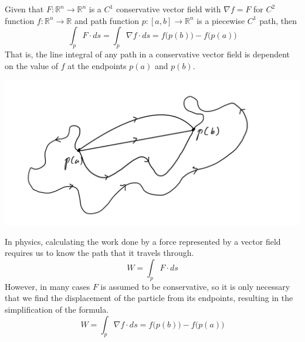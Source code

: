   \begin{theorem}
  Given that $F: \mathbb{R}^n \longrightarrow \mathbb{R}^n$ is a $C^1$ conservative vector field with $\nabla f = F$ for $C^2$ function $f: \mathbb{R}^n \longrightarrow \mathbb{R}$ and path function $p: [a,b] \longrightarrow \mathbb{R}^n$ is a piecewise $C^1$ path, then 
  \[\int_p F \cdot d s = \int_p \nabla f \cdot d s = f\big(p(b)\big) - f\big(p(a)\big)\]
  That is, the line integral of any path in a conservative vector field is dependent on the value of $f$ at the endpoints $p(a)$ and $p(b)$. 
  \begin{center}
      \includegraphics[scale=0.2]{img/Line_Integral_Independence_of_path.PNG}
  \end{center}
  \end{theorem}

  In physics, calculating the work done by a force represented by a vector field requires us to know the path that it travels through. 
  \[W = \int_p F \cdot ds\]
  However, in many cases $F$ is assumed to be conservative, so it is only necessary that we find the displacement of the particle from its endpoints, resulting in the simplification of the formula.  
  \[W = \int_p \nabla f \cdot ds = f\big( p(b)\big) - f \big(p(a)\big)\]

